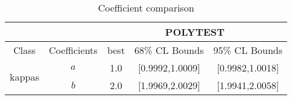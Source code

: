 \documentclass{article}
\begin{document}
\begin{table}[H]
\centering
\begin{tabular}{|c|c|c|c|c|}
\hline
 &  & \multicolumn{3}{c|}{POLYTEST} \\ \hline
Class & Coefficients & best & 68\% CL Bounds & 95\% CL Bounds\\ \hline
\multirow{2}{*}{kappas}
 & $a$ & 1.0                             & [0.9992,1.0009]                                 & [0.9982,1.0018] \\ \cline{2-5}
 & $b$ & 2.0                             & [1.9969,2.0029]                                 & [1.9941,2.0058] \\ \cline{2-5}
\hline
\end{tabular}
\caption{Coefficient comparison}
\end{table}
\end{document}
